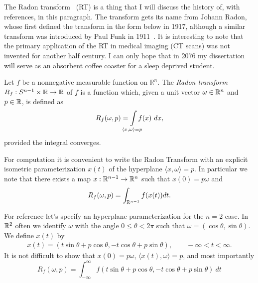 The Radon transform~\cite{Helg65} (RT) is a thing that I will discuss the history of, with references, in this paragraph. The transform gets its name from Johann Radon, whose first defined the transform in the form below in 1917, although a similar transform was introduced by Paul Funk in 1911~\cn. It is interesting to note that the primary application of the RT in medical imaging (CT scans) was not invented for another half century. I can only hope that in 2076 my dissertation will serve as an absorbent coffee coaster for a sleep deprived student.

\begin{definition}
  Let $f$ be a nonnegative measurable function on $\mathbb{R}^n$. The \emph{Radon transform} $R_f : S^{n-1} \times \mathbb{R} \rightarrow \mathbb{R}$ of $f$ is a function which, given a unit vector $\omega \in \mathbb{R}^n$ and $p \in \mathbb{R}$, is defined as
  \[
    R_f(\omega, p) = \int\mclimits_{\langle x, \omega \rangle = p} f(x) ~dx,
  \]
  provided the integral converges.
\end{definition}

\begin{myexample}
  For computation it is convenient to write the Radon Transform with an explicit isometric parameterization $x(t)$ of the hyperplane $\langle x, \omega\rangle = p$. In particular we note that there exists a map $x : \mathbb{R}^{n-1} \rightarrow \mathbb{R}^n$ such that $x(0) = p\omega$ and
  \[
    R_f(\omega, p) = \int_{\mathbb{R}^{n-1}} f(x(t)) dt.
  \]

  For reference let's specify an hyperplane parameterization for the $n=2$ case. In $\mathbb{R}^2$ often we identify $\omega$ with the angle $0 \leq \theta < 2\pi$ such that $\omega = (\cos \theta, \sin \theta)$. We define $x(t)$ by
  \begin{align*}
    x(t) = (t \sin \theta + p \cos \theta, -t \cos \theta + p \sin \theta), \qquad -\infty < t < \infty.
  \end{align*}
  It is not difficult to show that $x(0) = p\omega$, $\langle x(t), \omega \rangle = p$, and most importantly
  \[
    R_f(\omega, p) = \int_{-\infty}^\infty f(t \sin \theta + p \cos \theta, -t \cos \theta + p \sin \theta)~dt
  \]
\end{myexample}

